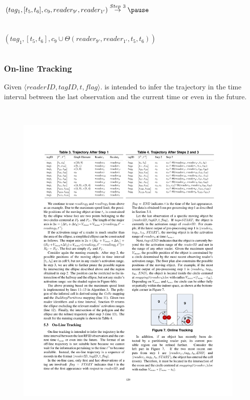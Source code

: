 \begin{frame}
\begin{columns}[c]
{  $(tag_1, [t_5,t_6], c_9, reader_{9'}, reader_{1'}) \overset{Step~3}{\rightarrow} \pause$ \\~\\~\\

  $(tag_1, [t_5,t_6], c_9 \cup \Theta(reader_{9'}, reader_{1'}, t_5, t_6))$
}

\end{columns}

\end{frame}


\begin{frame}
\frametitle{On-line Tracking}

\small{\textrm{Given $\langle readerID, tagID, t, flag \rangle$.  is intended to infer the trajectory in the time interval between the last observation and the current time or even in the future.}}
\\~\\

\begin{columns}[c]

  \begin{figure}[tb]
    \includegraphics[width=\columnwidth]{figures/2-1/2-1-13.pdf}
  \end{figure}



\end{columns}
\end{frame}
